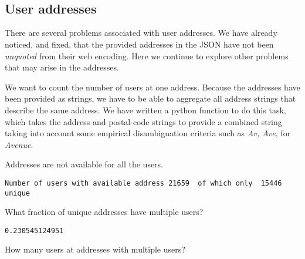 \documentclass{report}
\begin{document}
    \begin{center}
    \end{center}
    { \hspace*{\fill} \\}
    
    \begin{center}
    \end{center}
    { \hspace*{\fill} \\}
    
    \subsection{User addresses}\label{user-addresses}

There are several problems associated with user addresses. We have
already noticed, and fixed, that the provided addresses in the JSON have
not been \emph{unquoted} from their web encoding. Here we continue to
explore other problems that may arise in the addresses.

We want to count the number of users at one address. Because the
addresses have been provided as strings, we have to be able to aggregate
all address strings that describe the same address. We have written a
python function to do this task, which takes the address and postal-code
strings to provide a combined string taking into account some empirical
disambiguation criteria such as \emph{Av, Ave}, for \emph{Avenue}.

Addresses are not available for all the users.


    \begin{Verbatim}[commandchars=\\\{\}]
Number of users with available address 21659  of which only  15446  unique
    \end{Verbatim}


    What fraction of unique addresses have multiple users?


    \begin{Verbatim}[commandchars=\\\{\}]
0.230545124951
    \end{Verbatim}

    How many users at addresses with multiple users?
\end{document}
